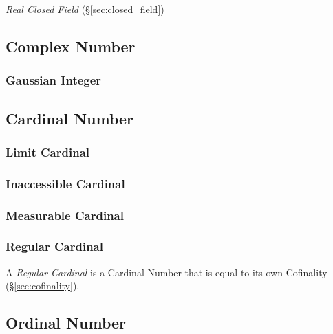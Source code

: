 \emph{Real Closed Field} (\S\ref{sec:closed_field})



\subsection{Complex Number}\label{sec:complex_number}

\subsubsection{Gaussian Integer}\label{sec:gaussian_integer}



\subsection{Cardinal Number}\label{sec:cardinal_number}

\subsubsection{Limit Cardinal}\label{sec:limit_cardinal}

\subsubsection{Inaccessible Cardinal}\label{sec:inaccessible_cardinal}

\subsubsection{Measurable Cardinal}\label{sec:measurable_cardinal}

\subsubsection{Regular Cardinal}\label{sec:regular_cardinal}

A \emph{Regular Cardinal} is a Cardinal Number that is equal to its
own Cofinality (\S\ref{sec:cofinality}).



\subsection{Ordinal Number}\label{sec:ordinal_number}

